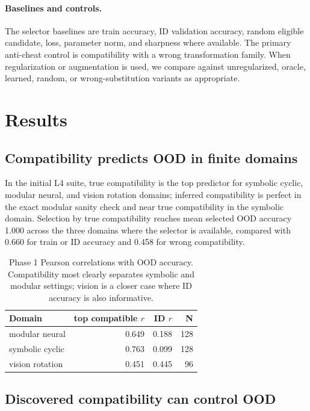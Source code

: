 \documentclass[10pt,twocolumn]{article}
\begin{document}
\paragraph{Baselines and controls.}
The selector baselines are train accuracy, ID validation accuracy, random
eligible candidate, loss, parameter norm, and sharpness where available. The
primary anti-cheat control is compatibility with a wrong transformation family.
When regularization or augmentation is used, we compare against unregularized,
oracle, learned, random, or wrong-substitution variants as appropriate.

\section{Results}

\subsection{Compatibility predicts OOD in finite domains}

In the initial L4 suite, true compatibility is the top predictor for symbolic
cyclic, modular neural, and vision rotation domains; inferred compatibility is
perfect in the exact modular sanity check and near true compatibility in the
symbolic domain. Selection by true compatibility reaches mean selected OOD
accuracy 1.000 across the three domains where the selector is available,
compared with 0.660 for train or ID accuracy and 0.458 for wrong compatibility.

\begin{table}[t]
\centering
\small
\begin{tabular}{lrrr}
\toprule
Domain & top compatible $r$ & ID $r$ & N \\
\midrule
modular neural & 0.649 & 0.188 & 128 \\
symbolic cyclic & 0.763 & 0.099 & 128 \\
vision rotation & 0.451 & 0.445 & 96 \\
\bottomrule
\end{tabular}
\caption{Phase 1 Pearson correlations with OOD accuracy. Compatibility most
clearly separates symbolic and modular settings; vision is a closer case where
ID accuracy is also informative.}
\label{tab:phase1}
\end{table}

\subsection{Discovered compatibility can control OOD}
\end{document}
